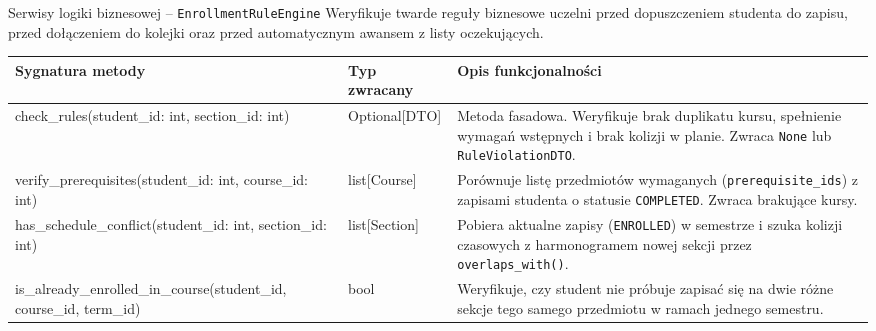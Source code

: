 \documentclass[aspectratio=169, 10pt, xcolor=table]{beamer}
\renewcommand{\arraystretch}{1.18}
\begin{document}
\begin{frame}{Serwisy logiki biznesowej -- \texttt{EnrollmentRuleEngine}}
    \scriptsize
    \renewcommand{\arraystretch}{1.15}
    Weryfikuje twarde reguły biznesowe uczelni przed dopuszczeniem studenta do zapisu, przed dołączeniem do kolejki oraz przed automatycznym awansem z listy oczekujących.
    \vspace{3pt}

    \begin{tabularx}{\textwidth}{@{} M{0.36\textwidth} T{0.16\textwidth} Y @{}}
        \toprule
        \textbf{\textsf{\textcolor{NavyPrimary}{Sygnatura metody}}} & \textbf{\textsf{\textcolor{NavyPrimary}{Typ zwracany}}} & \textbf{\textcolor{NavyPrimary}{Opis funkcjonalności}} \\
        \midrule
        check\_rules(student\_id: int, section\_id: int) & Optional[DTO] & Metoda fasadowa. Weryfikuje brak duplikatu kursu, spełnienie wymagań wstępnych i brak kolizji w planie. Zwraca \texttt{None} lub \texttt{RuleViolationDTO}. \\
        verify\_prerequisites(student\_id: int, course\_id: int) & list[Course] & Porównuje listę przedmiotów wymaganych (\texttt{prerequisite\_ids}) z zapisami studenta o statusie \texttt{COMPLETED}. Zwraca brakujące kursy. \\
        has\_schedule\_conflict(student\_id: int, section\_id: int) & list[Section] & Pobiera aktualne zapisy (\texttt{ENROLLED}) w semestrze i szuka kolizji czasowych z harmonogramem nowej sekcji przez \texttt{overlaps\_with()}. \\
        is\_already\_enrolled\_in\_course(\newline student\_id, course\_id, term\_id) & bool & Weryfikuje, czy student nie próbuje zapisać się na dwie różne sekcje tego samego przedmiotu w ramach jednego semestru. \\
        \bottomrule
    \end{tabularx}
\end{frame}
\end{document}
